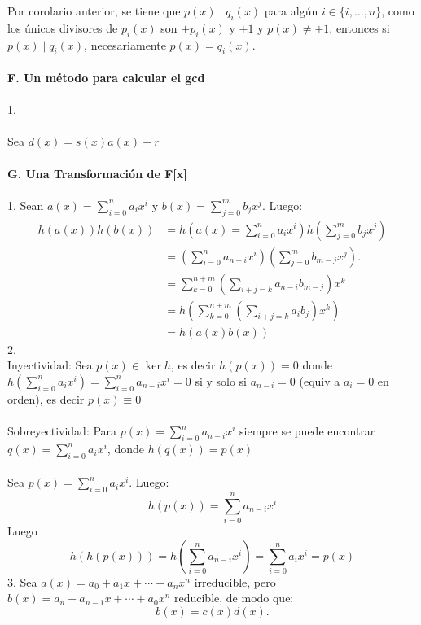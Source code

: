 \documentclass{article}
\begin{document}
Por corolario anterior, se tiene que $p(x) \mid q_{i}(x)$ para algún $i \in \{i,\dots,n \}$, como los únicos divisores de $p_{i}(x)$ son $\pm p_{i}(x)$ y $\pm 1$ y $p(x) \neq \pm 1$, entonces si $p(x) \mid q_{i}(x)$, necesariamente $p(x)=q_{i}(x)$.
\\
\\
\textbf{F. Un método para calcular el gcd}
\\
\\
1.
\\
\\
Sea $d(x)=s(x)a(x)+r$
\\
\\
\textbf{G. Una Transformación de F[x]}
\\
\\
1. Sean $a(x)=\sum_{i=0}^{n}a_{i}x^{i}$ y $b(x)=\sum_{j=0}^{m}b_{j}x^{j}$. Luego:
\begin{equation*}
\begin{aligned}
    h(a(x))h(b(x)) &= h\left(a(x) = \sum_{i=0}^{n}a_{i}x^{i}\right) 
    h\left(\sum_{j=0}^{m}b_{j}x^{j}\right) \\
    &= \left( \sum_{i=0}^{n}a_{n-i}x^{i}\right) 
    \left( \sum_{j=0}^{m} b_{m-j}x^{j}\right). \\
    &= \sum_{k=0}^{n+m} \left( \sum_{i+j=k} a_{n-i}b_{m-j}\right)x^{k} \\
    & =h \left( \sum_{k=0}^{n+m} \left( \sum_{i+j=k}a_{i}b_{j} \right)x^{k}\right) \\
    &=h(a(x)b(x))
\end{aligned}
\end{equation*}
2. 
\\
Inyectividad: Sea $p(x) \in \ker h$, es decir $h(p(x))=0$ donde $h\left( \sum_{i=0}^{n} a_{i}x^{i} \right)= \sum_{i=0}^{n} a_{n-i}x^{i} = 0$ si y solo si $a_{n-i}=0$ (equiv a $a_{i}=0$ en orden), es decir $p(x) \equiv 0$
\\
\\
Sobreyectividad: Para $p(x)=\sum_{i=0}^{n}a_{n-i}x^{i}$ siempre se puede encontrar $q(x)=\sum_{i=0}^{n} a_{i}x^{i}$, donde $h(q(x))=p(x)$
\\
\\
Sea $p(x)=\sum_{i=0}^{n}a_{i}x^{i}$. Luego:
\begin{equation*} 
 h(p(x))=\sum_{i=0}^{n} a_{n-i}x^{i}
\end{equation*}
Luego
\begin{equation*}
    h(h(p(x)))=h\left( \sum_{i=0}^{n} a_{n-i}x^{i} \right) = \sum_{i=0}^{n}a_{i}x^{i} = p(x)
\end{equation*}
3. Sea \( a(x) = a_0 + a_1x + \cdots + a_nx^n \) irreducible, pero \( b(x) = a_n + a_{n-1}x + \cdots + a_0x^n \) reducible, de modo que:
\[
b(x) = c(x)d(x).
\]
\end{document}
